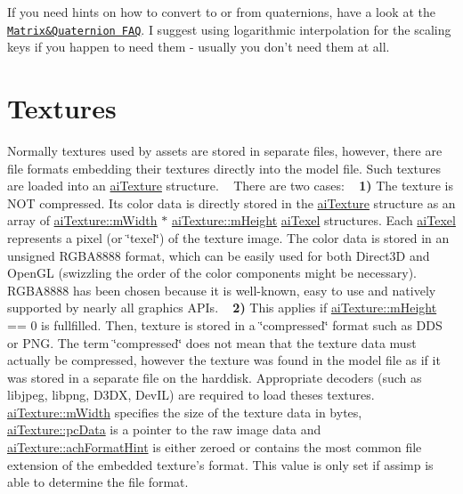 If you need hints on how to convert to or from quaternions, have a look at the \href{http://www.j3d.org/matrix_faq/matrfaq_latest.html}{\tt Matrix\&Quaternion F\+A\+Q}. I suggest using logarithmic interpolation for the scaling keys if you happen to need them -\/ usually you don't need them at all.\hypertarget{data_textures}{}\section{Textures}\label{data_textures}
Normally textures used by assets are stored in separate files, however, there are file formats embedding their textures directly into the model file. Such textures are loaded into an \hyperlink{structai_texture}{ai\+Texture} structure. ~\newline
 There are two cases\+: ~\newline
 {\bfseries 1)} The texture is N\+O\+T compressed. Its color data is directly stored in the \hyperlink{structai_texture}{ai\+Texture} structure as an array of \hyperlink{structai_texture_aaa3ad8cfe44fdc4dea2db91977d92234}{ai\+Texture\+::m\+Width} $\ast$ \hyperlink{structai_texture_ac1e2fa6f1f646e9c55e3985d4418a752}{ai\+Texture\+::m\+Height} \hyperlink{structai_texel}{ai\+Texel} structures. Each \hyperlink{structai_texel}{ai\+Texel} represents a pixel (or \char`\"{}texel\char`\"{}) of the texture image. The color data is stored in an unsigned R\+G\+B\+A8888 format, which can be easily used for both Direct3\+D and Open\+G\+L (swizzling the order of the color components might be necessary). R\+G\+B\+A8888 has been chosen because it is well-\/known, easy to use and natively supported by nearly all graphics A\+P\+Is. ~\newline
 {\bfseries 2)} This applies if \hyperlink{structai_texture_ac1e2fa6f1f646e9c55e3985d4418a752}{ai\+Texture\+::m\+Height} == 0 is fullfilled. Then, texture is stored in a \char`\"{}compressed\char`\"{} format such as D\+D\+S or P\+N\+G. The term \char`\"{}compressed\char`\"{} does not mean that the texture data must actually be compressed, however the texture was found in the model file as if it was stored in a separate file on the harddisk. Appropriate decoders (such as libjpeg, libpng, D3\+D\+X, Dev\+I\+L) are required to load theses textures. \hyperlink{structai_texture_aaa3ad8cfe44fdc4dea2db91977d92234}{ai\+Texture\+::m\+Width} specifies the size of the texture data in bytes, \hyperlink{structai_texture_aeb07528748b6e49d2d81c60006024f9a}{ai\+Texture\+::pc\+Data} is a pointer to the raw image data and \hyperlink{structai_texture_aa9f44996acf3b301bfeb4e5348311540}{ai\+Texture\+::ach\+Format\+Hint} is either zeroed or contains the most common file extension of the embedded texture's format. This value is only set if assimp is able to determine the file format. 